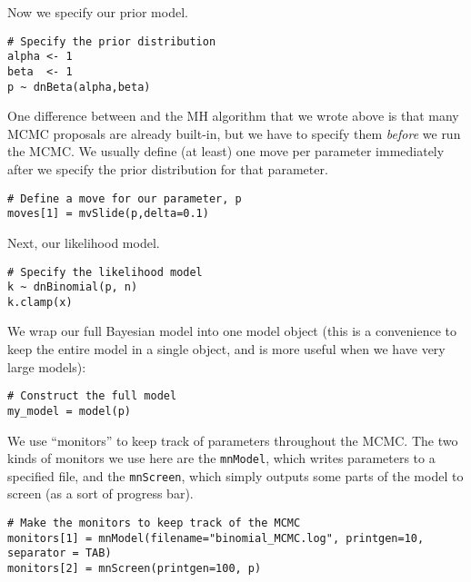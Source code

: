 Now we specify our prior model.
{\tt \begin{snugshade*}
\begin{lstlisting}    
# Specify the prior distribution
alpha <- 1
beta  <- 1
p ~ dnBeta(alpha,beta)
\end{lstlisting}
\end{snugshade*}}

One difference between \RevBayes and the MH algorithm that we wrote above is that many MCMC proposals are already built-in, but we have to specify them \emph{before} we run the MCMC.
We usually define (at least) one move per parameter immediately after we specify the prior distribution for that parameter.

{\tt \begin{snugshade*}
\begin{lstlisting}    
# Define a move for our parameter, p
moves[1] = mvSlide(p,delta=0.1)
\end{lstlisting}
\end{snugshade*}}

Next, our likelihood model.
{\tt \begin{snugshade*}
\begin{lstlisting}    
# Specify the likelihood model
k ~ dnBinomial(p, n)
k.clamp(x)
\end{lstlisting}
\end{snugshade*}}

We wrap our full Bayesian model into one model object (this is a convenience to keep the entire model in a single object, and is more useful when we have very large models):
{\tt \begin{snugshade*}
\begin{lstlisting}    
# Construct the full model
my_model = model(p)
\end{lstlisting}
\end{snugshade*}}

We use ``monitors'' to keep track of parameters throughout the MCMC.
The two kinds of monitors we use here are the \texttt{mnModel}, which writes parameters to a specified file, and the \texttt{mnScreen}, which simply outputs some parts of the model to screen (as a sort of progress bar).
{\tt \begin{snugshade*}
\begin{lstlisting}    
# Make the monitors to keep track of the MCMC
monitors[1] = mnModel(filename="binomial_MCMC.log", printgen=10, separator = TAB)
monitors[2] = mnScreen(printgen=100, p)
\end{lstlisting}
\end{snugshade*}}

